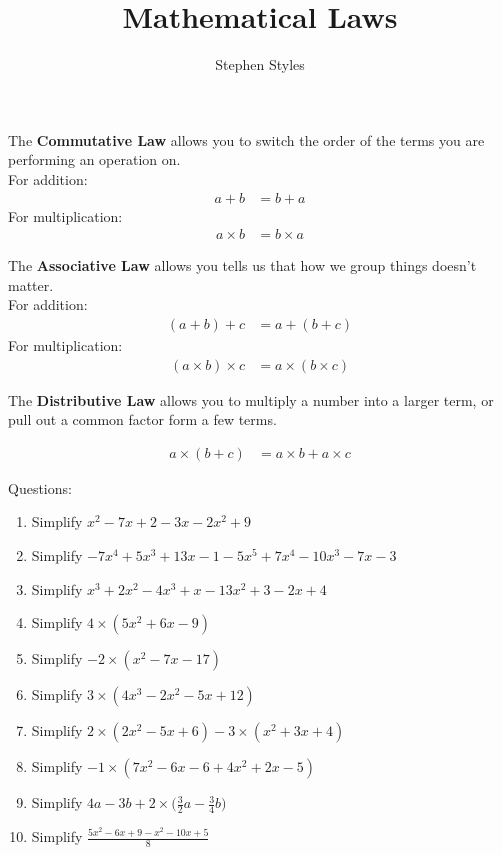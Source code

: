 \documentclass[16pt]{article}
\title{Mathematical Laws}
\author{Stephen Styles}
\theoremstyle{remark}
\begin{document}
\maketitle

The \textbf{Commutative Law} allows you to switch the order of the terms you are performing an operation on.\\

For addition:
\begin{align*}
a+b &= b +a
\end{align*}
For multiplication:
\begin{align*}
a\times b &= b\times a
\end{align*}

The \textbf{Associative Law} allows you tells us that how we group things doesn't matter.\\

For addition:
\begin{align*}
(a + b) + c &= a + (b + c)
\end{align*}
For multiplication:
\begin{align*}
(a\times b) \times c &= a \times (b \times c)
\end{align*}

The \textbf{Distributive Law} allows you to multiply a number into a larger term, or pull out a common factor form a few terms.

\begin{align*}
a\times (b+c) &= a\times b + a \times c
\end{align*}

Questions:
\begin{enumerate}
\item Simplify $\displaystyle{x^2-7x+2 - 3x-2x^2+9}$
\vspace{3cm}

\item Simplify $\displaystyle{-7x^4+5x^3+13x-1 - 5x^5 +7x^4 - 10x^3 -7x-3}$
\newpage

\item Simplify $\displaystyle{x^3+2x^2-4x^3+x-13x^2+3-2x+4}$
\vspace{5cm}

\item Simplify $\displaystyle{4\times(5x^2+6x-9)}$
\vspace{5cm}
\item Simplify $\displaystyle{-2\times(x^2-7x-17)}$
\vspace{5cm}
\item Simplify $\displaystyle{3\times(4x^3-2x^2-5x+12)}$
\vspace{5cm}
\newpage
\item Simplify $\displaystyle{2\times(2x^2-5x+6)-3\times(x^2+3x+4)}$
\vspace{5cm}
\item Simplify $\displaystyle{-1\times(7x^2-6x-6+4x^2+2x-5)}$
\vspace{5cm}
\item Simplify $\displaystyle{4a-3b + 2\times\bigg(\frac{3}{2}a -\frac{3}{4}b\bigg)}$
\vspace{5cm}
\item Simplify $\displaystyle{\frac{5x^2-6x+9-x^2-10x+5}{8}}$
\vspace{5cm}
\end{enumerate}
\end{document}
